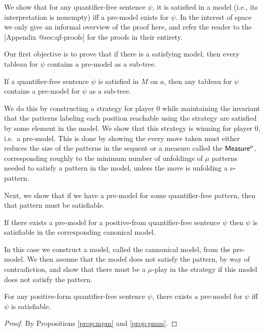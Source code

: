 We show that for any quantifier-free sentence \(\psi\), it is satisfied in a
model (i.e., its interpretation is nonempty) iff a pre-model exists for \(\psi\).
In the interest of space we only give an informal overview of the proof here,
and refer the reader to the {[}Appendix @sec:qf-proofs{]} for the proofs in their
entirety.

Our first objective is to prove that if there is a satisfying model, then
every tableau for \(\psi\) contains a pre-model as a sub-tree.

\begin{proposition}
\label{prop:mpm}
If a quantifier-free sentence $\psi$ is satisfied in $M$ on $a$, then
any tableau for $\psi$ contains a pre-model for $\psi$ as a sub-tree. 
\end{proposition}

We do this by constructing a strategy for player \(0\) while maintaining the
invariant that the patterns labeling each position reachable using the strategy
are satisfied by some element in the model.
We show that this strategy is winning for player \(0\), i.e.~a pre-model.
This is done by showing the every move taken must either reduces the size of the patterns in the sequent
or a measure called the \(\mathsf{Measure}^\mu\), corresponding roughly to the minimum number of unfoldings of \(\mu\) patterns needed to satisfy a pattern in the model,
unless the move is unfolding a \(\nu\)-pattern.

Next, we show that if we have a pre-model for some quantifier-free pattern,
then that pattern must be satisfiable.

\begin{proposition}\label{prop:pmm}
If there exists a pre-model for a positive-from quantifier-free sentence $\psi$
then $\psi$ is satisfiable in the corresponding canonical model. 
\end{proposition}

In this case we construct a model, called the cannonical model, from the pre-model.
We then assume that the model does not satisfy the pattern, by way of contradiction,
and show that there must be a \(\mu\)-play in the strategy if this model does
not satisfy the pattern.

\begin{theorem}\label{thm:pm}
For any positive-form quantifier-free sentence $\psi$, there exists a pre-model for $\psi$ 
iff $\psi$ is satisfiable.
\end{theorem}
\begin{proof}
By Propositions \ref{prop:mpm} and \ref{prop:pmm}. 
\end{proof}


